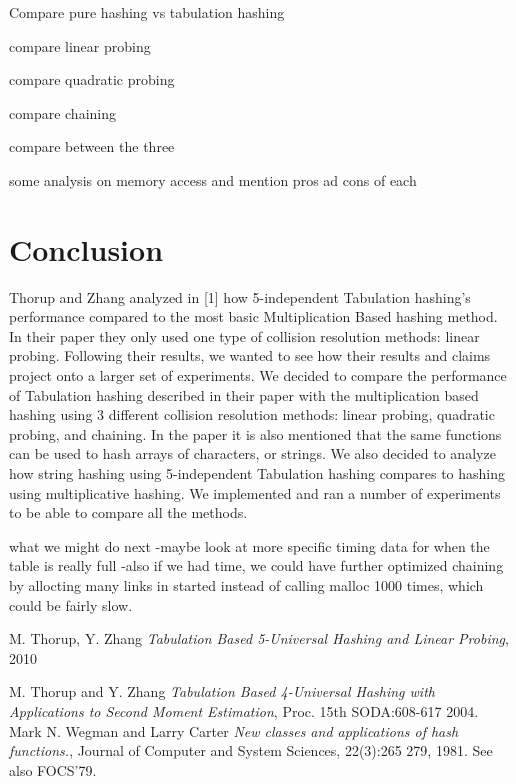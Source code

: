 \documentclass[11pt]{article}
\begin{document}
Compare pure hashing vs tabulation hashing

compare linear probing

compare quadratic probing

compare chaining

compare between the three

some analysis on memory access  and mention pros ad cons of each


\section{Conclusion}
Thorup and Zhang analyzed in [1] how 5-independent Tabulation hashing's performance compared to the most basic Multiplication Based hashing method. In their paper they only used one type of collision resolution methods: linear probing. Following their results, we wanted to see how their results and claims project onto a larger set of experiments. We decided to compare the performance of Tabulation hashing described in their paper with the multiplication based hashing using 3 different collision resolution methods: linear probing, quadratic probing, and chaining. In the paper it is also mentioned that the same functions can be used to hash arrays of characters, or strings. We also decided to analyze how string hashing using 5-independent Tabulation hashing compares to hashing using multiplicative hashing. We implemented and ran a number of experiments to be able to compare all the methods. 





what we might do next
-maybe look at more specific timing data for when the table is really full
-also if we had time, we could have further optimized chaining by allocting many links in started 
instead of calling malloc 1000 times, which could be fairly slow.



\begin{thebibliography}{77}

M. Thorup, Y. Zhang
\emph{Tabulation Based 5-Universal Hashing and Linear Probing},
2010

M. Thorup and Y. Zhang 
\emph{Tabulation Based 4-Universal Hashing with Applications to Second Moment Estimation},
Proc. 15th SODA:608-617 2004.
Mark N. Wegman and Larry Carter
\emph{New classes and applications of hash functions.},
Journal of Computer and System Sciences, 22(3):265 279, 1981. See also FOCS'79.
\end{thebibliography}


\end{document}
